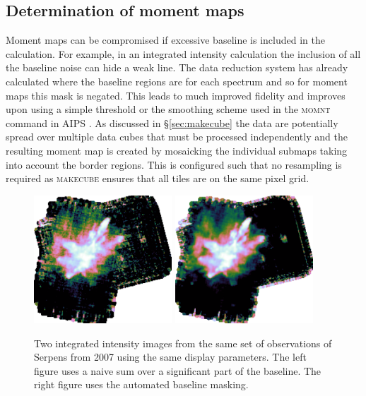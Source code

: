 \documentclass[final,authoryear,5p,times,twocolumn]{elsarticle}
\begin{document}
\subsection{Determination of moment maps \label{sec:moment}}

Moment maps can be compromised if excessive baseline is included in
the calculation. For example, in an integrated intensity calculation
the inclusion of all the baseline noise can hide a weak line. The data
reduction system has already calculated where the baseline regions are
for each spectrum and so for moment maps this mask is negated. This
leads to much improved fidelity and improves upon using a simple threshold or
the smoothing scheme used in the \textsc{momnt} command in AIPS
\cite[][ascl:9911.003]{2003ASSL..285..109G}. As discussed in \S \ref{sec:makecube}
the data are potentially spread over multiple data cubes that must be
processed independently and the resulting moment map is created by
mosaicking the individual submaps taking into account the border
regions. This is configured such that no resampling is required as
\textsc{makecube} ensures that all tiles are on the same pixel grid.

\begin{figure}
\begin{minipage}{\textwidth}
\centering
\includegraphics[width=0.46\textwidth]{integ_manual.png}
\includegraphics[width=0.46\textwidth]{integ_auto.png}
\caption{Two integrated intensity images from the same set of
  observations of Serpens from 2007 using the same display
  parameters. The left figure uses a naive sum over a significant part
  of the baseline. The right figure uses the automated baseline
  masking.}
\label{fig:integ}
\end{minipage}
\end{figure}
\end{document}
